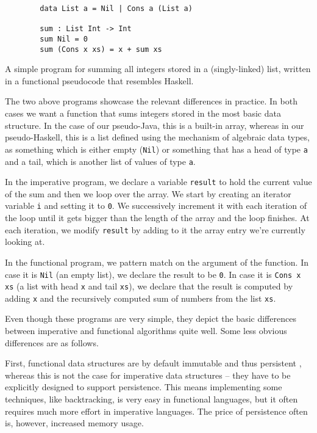 \documentclass[declaration,mgr,english,shortabstract]{iithesis}
\newcommand{\m}[1]{\texttt{#1}}
\begin{document}
\begin{listing}[H]
    \begin{verbatim}
        data List a = Nil | Cons a (List a)

        sum : List Int -> Int
        sum Nil = 0
        sum (Cons x xs) = x + sum xs
    \end{verbatim}
    \begin{center}
        \caption{A simple program for summing all integers stored in a (singly-linked) list, written in a functional pseudocode that resembles Haskell.}
    \end{center}
\end{listing}

The two above programs showcase the relevant differences in practice. In both cases we want a function that sums integers stored in the most basic data structure. In the case of our pseudo-Java, this is a built-in array, whereas in our pseudo-Haskell, this is a list defined using the mechanism of algebraic data types, as something which is either empty (\m{Nil}) or something that has a head of type \m{a} and a tail, which is another list of values of type \m{a}.

In the imperative program, we declare a variable \m{result} to hold the current value of the sum and then we loop over the array. We start by creating an iterator variable \m{i} and setting it to \m{0}. We successively increment it with each iteration of the loop until it gets bigger than the length of the array and the loop finishes. At each iteration, we modify \m{result} by adding to it the array entry we're currently looking at.

In the functional program, we pattern match on the argument of the function. In case it is \m{Nil} (an empty list), we declare the result to be \m{0}. In case it is \m{Cons x xs} (a list with head \m{x} and tail \m{xs}), we declare that the result is computed by adding \m{x} and the recursively computed sum of numbers from the list \m{xs}.

Even though these programs are very simple, they depict the basic differences between imperative and functional algorithms quite well. Some less obvious differences are as follows.

First, functional data structures are by default immutable and thus persistent \cite{PersistentDataStructures}, whereas this is not the case for imperative data structures -- they have to be explicitly designed to support persistence. This means implementing some techniques, like backtracking, is very easy in functional languages, but it often requires much more effort in imperative languages. The price of persistence often is, however, increased memory usage.
\end{document}
